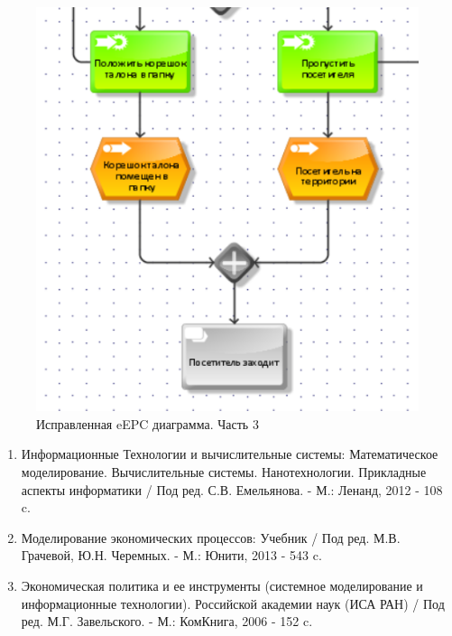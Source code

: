 \documentclass[a4paper,14pt]{extarticle}
\begin{document}
\begin{problem*}
	\begin{figure}[h!]
		\centering
		\includegraphics[width=0.7\linewidth]{images/pr-20/3.3}
		\caption{Исправленная eEPC диаграмма.
 Часть 3}
		\label{fig:3.3}
	\end{figure}
	
	
	
\end{problem*}



\newpage\mbox{}\newpage
{}
\begin{enumerate}
	\item Информационные Технологии и вычислительные системы: Математическое
	моделирование. Вычислительные системы. Нанотехнологии. Прикладные
	аспекты информатики / Под ред. С.В. Емельянова. - М.: Ленанд, 2012 - 108 c.
	\item  Моделирование экономических процессов: Учебник / Под ред. М.В.
	Грачевой, Ю.Н. Черемных. - М.: Юнити, 2013 - 543 c.
	\item  Экономическая политика и ее инструменты (системное моделирование и
	информационные
	технологии).
	Российской академии наук (ИСА РАН) / Под ред. М.Г. Завельского. - М.:
	КомКнига, 2006 - 152 c.
\end{enumerate}
\end{document}
